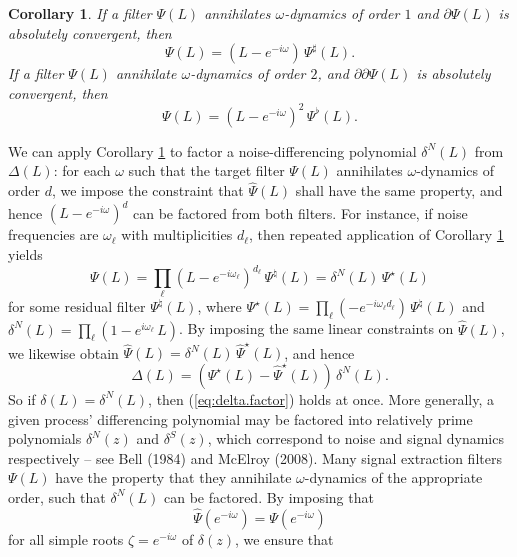 \documentclass[a4paper]{book}
\newtheorem{Corollary}{Corollary}
\begin{document}
\begin{Corollary}
 \label{cor:filter-noise}
  If a filter $\Psi (L)$ annihilates $\omega$-dynamics of order $1$ 
  and $\partial \Psi (L)$ is absolutely convergent, then
\[
  \Psi (L) = (L- e^{-i \omega}) \, \Psi^{\sharp} (L).
\]
 If a filter $\Psi (L)$ annihilate $\omega$-dynamics of order $2$,  
 and $\partial \partial \Psi (L)$ is absolutely convergent, then
\[
  \Psi (L) = {(L- e^{-i \omega}) }^2 \, \Psi^{\flat} (L).
\]
\end{Corollary}

 We can apply Corollary \ref{cor:filter-noise} to factor a 
 noise-differencing polynomial $\delta^N (L)$ from $\Delta (L)$:
 for each $\omega$ such that the target filter $\Psi (L)$ annihilates
 $\omega$-dynamics of order $d$, we impose the constraint
 that $\widehat{\Psi} (L)$ shall have the same property, and hence 
 ${(L- e^{-i \omega})}^d$ can be factored from both
 filters.   For instance, if noise frequencies are $\omega_{\ell}$
 with multiplicities $d_{\ell}$, then repeated application of
 Corollary \ref{cor:filter-noise} yields
\[
 \Psi (L) = \prod_{\ell} {(L -  e^{-i \omega_{\ell}})}^{d_{\ell}} \, \Psi^{\natural} (L)
   = \delta^N (L) \, \Psi^{\star} (L)
\]
 for some residual filter $\Psi^{\natural} (L)$, where 
 $\Psi^{\star} (L) = \prod_{\ell} (-e^{-i \omega_{\ell} d_{\ell}}) \, \Psi^{\natural} (L)$
 and $\delta^N (L) = \prod_{\ell} (1 - e^{i \omega_{\ell}} \, L)$.
 By imposing the same linear constraints on $\widehat{\Psi} (L)$, 
 we likewise obtain $\widehat{\Psi} (L) = \delta^N (L) \, \widehat{\Psi}^{\star} (L)$,
 and hence
\begin{equation}
 \label{eq:delta-noise}
\Delta (L) = \left(  {\Psi}^{\star} (L) - 
\widehat{\Psi}^{\star} (L) \right) \, \delta^N (L).
\end{equation}
  So if $\delta (L) = \delta^N (L)$, then (\ref{eq:delta.factor}) 
  holds at once.  More generally, a given process' differencing polynomial
 may be factored into relatively prime polynomials $\delta^N (z)$ and $\delta^S (z)$, 
 which correspond to noise and signal dynamics
 respectively -- see Bell (1984) and McElroy (2008). 
 Many  signal extraction filters $\Psi (L)$   have the property that they
 annihilate $\omega$-dynamics of the appropriate order, 
 such that $\delta^N (L)$ can be factored.
 By imposing that 
\begin{equation}
\label{eq:non-stat.constraint.single}
 \widehat{\Psi} (e^{-i \omega}) = \Psi (e^{-i \omega})
 \end{equation}
 for  all simple roots $\zeta = e^{-i \omega}$ of $\delta (z)$, we ensure that
\end{document}
